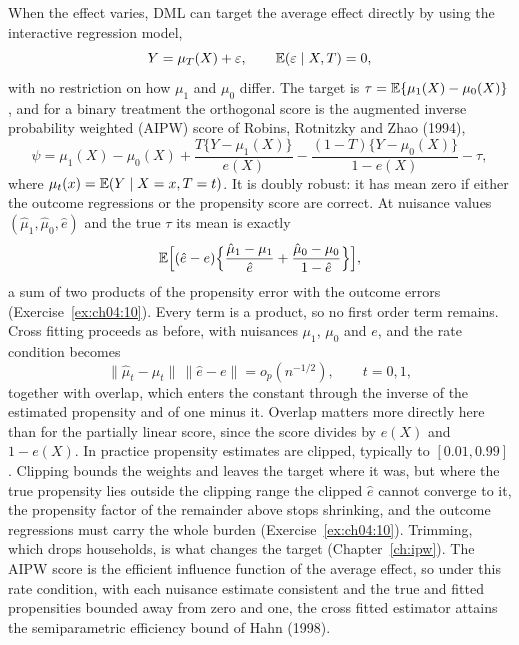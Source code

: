 When the effect varies, DML can target the average effect directly by using the interactive regression model,
\[
Y = \mu_T(X) + \varepsilon, \qquad \mathbb{E}(\varepsilon \mid X, T) = 0,
\]
with no restriction on how $\mu_1$ and $\mu_0$ differ. The target is $\tau = \mathbb{E}\{\mu_1(X) - \mu_0(X)\}$, and for a binary treatment the orthogonal score is the augmented inverse probability weighted (AIPW) score of Robins, Rotnitzky and Zhao (1994),
\begin{equation}
\psi = \mu_1(X) - \mu_0(X) + \frac{T\{Y - \mu_1(X)\}}{e(X)} - \frac{(1-T)\{Y - \mu_0(X)\}}{1 - e(X)} - \tau,
\label{eq:aipw}
\end{equation}
where $\mu_t(x) = \mathbb{E}(Y \mid X = x, T = t)$. It is doubly robust: it has mean zero if either the outcome regressions or the propensity score are correct. At nuisance values $(\hat\mu_1, \hat\mu_0, \hat e)$ and the true $\tau$ its mean is exactly
\[
\mathbb{E}\Bigl[(\hat e - e)\Bigl\{\frac{\hat\mu_1 - \mu_1}{\hat e} + \frac{\hat\mu_0 - \mu_0}{1 - \hat e}\Bigr\}\Bigr],
\]
a sum of two products of the propensity error with the outcome errors (Exercise~\ref{ex:ch04:10}). Every term is a product, so no first order term remains. Cross fitting proceeds as before, with nuisances $\mu_1$, $\mu_0$ and $e$, and the rate condition becomes
\[
\|\hat\mu_t - \mu_t\|\,\|\hat e - e\| = o_p(n^{-1/2}), \qquad t = 0, 1,
\]
together with overlap, which enters the constant through the inverse of the estimated propensity and of one minus it. Overlap matters more directly here than for the partially linear score, since the score divides by $e(X)$ and $1 - e(X)$. In practice propensity estimates are clipped, typically to $[0.01, 0.99]$. Clipping bounds the weights and leaves the target where it was, but where the true propensity lies outside the clipping range the clipped $\hat e$ cannot converge to it, the propensity factor of the remainder above stops shrinking, and the outcome regressions must carry the whole burden (Exercise~\ref{ex:ch04:10}). Trimming, which drops households, is what changes the target (Chapter~\ref{ch:ipw}). The AIPW score is the efficient influence function of the average effect, so under this rate condition, with each nuisance estimate consistent and the true and fitted propensities bounded away from zero and one, the cross fitted estimator attains the semiparametric efficiency bound of Hahn (1998).

